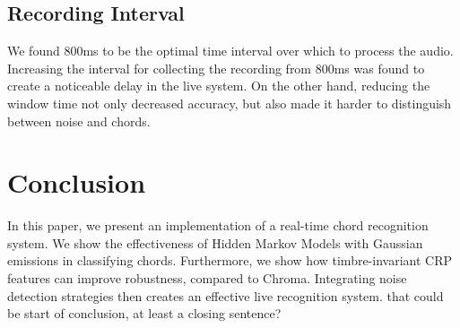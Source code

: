 \documentclass{article}
\begin{document}
\subsection{Recording Interval}
We found 800ms to be the optimal time interval over which to process the audio. Increasing the interval 
for collecting the recording from 800ms was found to create a noticeable delay in the live system. On the other hand, reducing the window time not only decreased accuracy, but also made it harder to distinguish between noise and chords.

\section{Conclusion}
In this paper, we present an implementation of a real-time chord recognition system. We show the effectiveness of Hidden Markov Models with Gaussian emissions in classifying chords. Furthermore, we show how timbre-invariant CRP features can improve robustness, compared to Chroma. Integrating noise detection strategies then creates an effective live recognition system.
that could be start of conclusion, at least a closing sentence?




\end{document}
